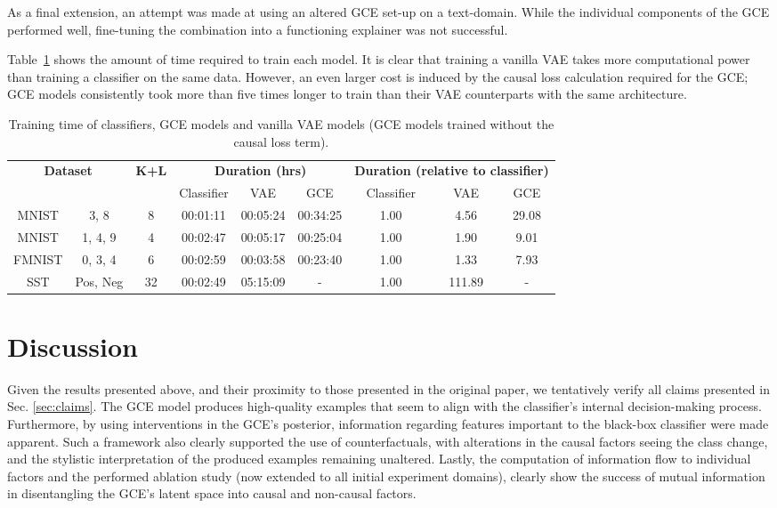 As a final extension, an attempt was made at using an altered GCE set-up on a text-domain. While the individual components of the GCE performed well, fine-tuning the combination into a functioning explainer was not successful. 

Table~\ref{tab:training_time} shows the amount of time required to train each model. It is clear that training a vanilla VAE takes more computational power than training a classifier on the same data. However, an even larger cost is induced by the causal loss calculation required for the GCE; GCE models consistently took more than five times longer to train than their VAE counterparts with the same architecture.

\begin{table}[t]
	\caption{Training time of classifiers, GCE models and vanilla VAE models (GCE models trained without the causal loss term).} 
	\label{tab:training_time}
	\small
	\centering
	\begin{tabular}{ccccccccc}
		\toprule
		\multicolumn{2}{c}{\multirow{2}[2]{*}{\textbf{Dataset}}} & \multirow{2}[2]{*}{\textbf{K+L}} & \multicolumn{3}{c}{\textbf{Duration (hrs)}} & \multicolumn{3}{c}{\textbf{Duration (relative to classifier)}} \\
		\multicolumn{2}{c}{} &       & Classifier & VAE   & GCE   & Classifier & VAE   & GCE \\
		\midrule
		MNIST & 3, 8  & 8     & 00:01:11 & 00:05:24 & 00:34:25 & 1.00  & 4.56  & 29.08 \\
		MNIST  & 1, 4, 9 & 4  & 00:02:47 & 00:05:17 & 00:25:04 & 1.00  & 1.90  & 9.01 \\
		FMNIST & 0, 3, 4 & 6  & 00:02:59 & 00:03:58 & 00:23:40 & 1.00  & 1.33  & 7.93 \\
		SST   & Pos, Neg & 32 & 00:02:49 & 05:15:09 & -  & 1.00  & 111.89 & - \\
		\bottomrule
	\end{tabular}
\end{table}

\section{Discussion}

Given the results presented above, and their proximity to those presented in the original paper, we tentatively verify all claims presented in Sec. \ref{sec:claims}. The GCE model produces high-quality examples that seem to align with the classifier's internal decision-making process. Furthermore, by using interventions in the GCE's posterior, information regarding features important to the black-box classifier were made apparent. Such a framework also clearly supported the use of counterfactuals, with alterations in the causal factors seeing the class change, and the stylistic interpretation of the produced examples remaining unaltered. Lastly, the computation of information flow to individual factors and the performed ablation study (now extended to all initial experiment domains), clearly show the success of mutual information in disentangling the GCE's latent space into causal and non-causal factors.

